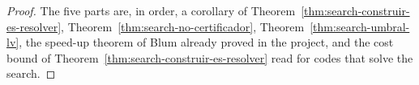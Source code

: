 \begin{proof}
  \leanok
  The five parts are, in order, a corollary of Theorem~\ref{thm:search-construir-es-resolver},
  Theorem~\ref{thm:search-no-certificador}, Theorem~\ref{thm:search-umbral-lv}, the speed-up theorem of
  Blum already proved in the project, and the cost bound of Theorem~\ref{thm:search-construir-es-resolver} read
  for codes that solve the search.
\end{proof}
